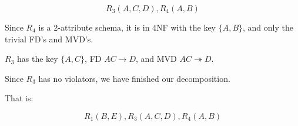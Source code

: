 \documentclass[12pt,letterpaper]{article}
\begin{document}
\begin{enumerate}
\begin{enumerate}
          \[R_3(A, C, D), R_4(A, B)\]

          Since $R_4$ is a 2-attribute schema,
          it is in 4NF with the key $\{A,B\}$, and only the trivial FD's and MVD's.

          $R_3$ has the key $\{A, C\}$, FD $AC \rightarrow D$, and MVD $AC \twoheadrightarrow D$.

          Since $R_3$ has no violators, we have finished our decomposition.

          That is:

          \[R_1(B,E), R_3(A, C, D), R_4(A, B)\]
      \end{enumerate}
  \end{enumerate}
\end{document}
